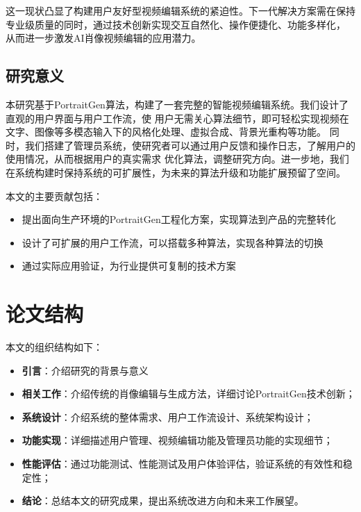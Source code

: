 这一现状凸显了构建用户友好型视频编辑系统的紧迫性。下一代解决方案需在保持专业级质量的同时，通过技术创新实现交互自然化、操作便捷化、功能多样化，
从而进一步激发AI肖像视频编辑的应用潜力。

\subsection{研究意义}

本研究基于PortraitGen算法，构建了一套完整的智能视频编辑系统。我们设计了直观的用户界面与用户工作流，使
用户无需关心算法细节，即可轻松实现视频在文字、图像等多模态输入下的风格化处理、虚拟合成、背景光重构等功能。
同时，我们搭建了管理员系统，使研究者可以通过用户反馈和操作日志，了解用户的使用情况，从而根据用户的真实需求
优化算法，调整研究方向。进一步地，我们在系统构建时保持系统的可扩展性，为未来的算法升级和功能扩展预留了空间。

本文的主要贡献包括：
\begin{itemize}
    \item 提出面向生产环境的PortraitGen工程化方案，实现算法到产品的完整转化
    \item 设计了可扩展的用户工作流，可以搭载多种算法，实现各种算法的切换
    \item 通过实际应用验证，为行业提供可复制的技术方案
\end{itemize}

\section{论文结构}

本文的组织结构如下：
\begin{itemize}
    \item \textbf{引言}：介绍研究的背景与意义
    \item \textbf{相关工作}：介绍传统的肖像编辑与生成方法，详细讨论PortraitGen技术创新；
    \item \textbf{系统设计}：介绍系统的整体需求、用户工作流设计、系统架构设计；
    \item \textbf{功能实现}：详细描述用户管理、视频编辑功能及管理员功能的实现细节；
    \item \textbf{性能评估}：通过功能测试、性能测试及用户体验评估，验证系统的有效性和稳定性；
    \item \textbf{结论}：总结本文的研究成果，提出系统改进方向和未来工作展望。
\end{itemize}

